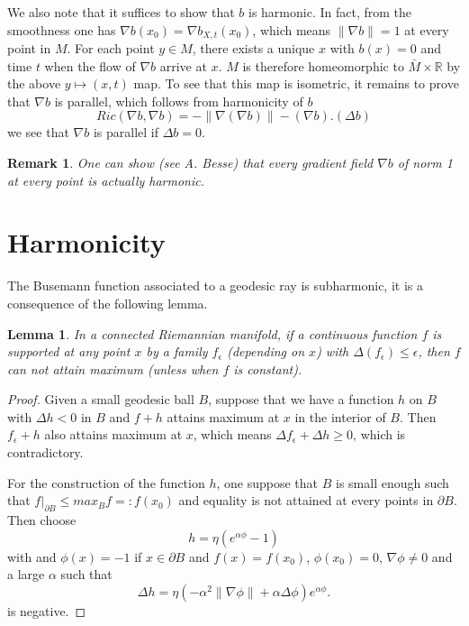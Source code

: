 \documentclass[11pt]{article}
\newtheorem{remark}{Remark}
\newtheorem{lemma}[theorem]{Lemma}
\begin{document}
We also note that it suffices to show that \(b\) is harmonic. In fact, from the smoothness one has
\(\nabla b(x_0) =\nabla b_{X,t}(x_0)\), which means \(\|\nabla b\| = 1\) at every point in \(M\). 
For each point \(y\in M\), there exists a unique \(x\) with \(b(x)=0\) and time \(t\) when the flow of
\(\nabla b\) arrive at \(x\). \(M\) is therefore homeomorphic to \(\bar M\times \mathbb{R}\) by the above
\(y\mapsto (x,t)\) map. To see that this map is isometric, it remains to prove that \(\nabla b\) is
parallel, which follows from harmonicity of \(b\)
\[
Ric(\nabla b,\nabla b) = -\|\nabla (\nabla b) \| - (\nabla b).(\Delta b)
\]
we see that \(\nabla b\) is parallel if \(\Delta b =0\).

\begin{remark}
One can show (see A. Besse) that every gradient field \(\nabla b\) of norm 1 at every point is
actually harmonic.
\end{remark}

\section{Harmonicity}
\label{sec:org42670c9}
The Busemann function associated to a geodesic ray is subharmonic, it is a consequence of the
following lemma.


\begin{lemma}
\label{lem:1}%
In a connected Riemannian manifold, if a continuous function \(f\) is supported at any point \(x\) by
a family \(f_\epsilon\) (depending on \(x\)) with \(\Delta(f_\epsilon)\leq \epsilon\), then \(f\) can not
attain maximum (unless when \(f\) is constant).
\end{lemma}

\begin{proof}
Given a small geodesic ball \(B\), suppose that we have a function \(h\) on \(B\) with \(\Delta h <0\) in \(B\) and
\(f+h\) attains maximum at \(x\) in the interior of \(B\). Then \(f_\epsilon + h\) also attains maximum at
\(x\), which means \(\Delta f_\epsilon + \Delta h \geq 0\), which is contradictory.

For the construction of the function \(h\), one suppose that \(B\) is small enough such that
\(f|_{\partial B} \leq max_B f=: f(x_0)\) and equality is not attained at every points in \(\partial B\). Then
choose
\[
h = \eta (e^{\alpha \phi} - 1)
\]
with and \(\phi(x) = -1\) if \(x\in \partial B\) and \(f(x) = f(x_0)\), \(\phi(x_0) = 0\),
\(\nabla \phi \ne 0\) and a large  \(\alpha\) such that
\[
\Delta h = \eta (-\alpha^2\| \nabla \phi\| + \alpha \Delta \phi)e^{\alpha \phi}.
\]
is negative.
\end{proof}
\end{document}
